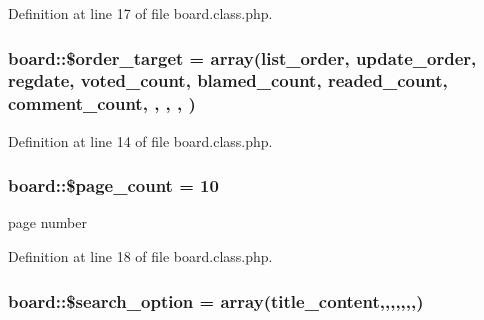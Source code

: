 Definition at line 17 of file board.\+class.\+php.

\subsubsection[{\texorpdfstring{\$order\+\_\+target}{$order_target}}]{\setlength{\rightskip}{0pt plus 5cm}board\+::\$order\+\_\+target = array(\textquotesingle{}list\+\_\+order\textquotesingle{}, \textquotesingle{}update\+\_\+order\textquotesingle{}, \textquotesingle{}regdate\textquotesingle{}, \textquotesingle{}voted\+\_\+count\textquotesingle{}, \textquotesingle{}blamed\+\_\+count\textquotesingle{}, \textquotesingle{}readed\+\_\+count\textquotesingle{}, \textquotesingle{}comment\+\_\+count\textquotesingle{}, \textquotesingle{}, \textquotesingle{}, \textquotesingle{}, \textquotesingle{})}\hypertarget{classboard_a66d1965fe6a51e8143499adeaf3998cc}{}\label{classboard_a66d1965fe6a51e8143499adeaf3998cc}


Definition at line 14 of file board.\+class.\+php.

\subsubsection[{\texorpdfstring{\$page\+\_\+count}{$page_count}}]{\setlength{\rightskip}{0pt plus 5cm}board\+::\$page\+\_\+count = 10}\hypertarget{classboard_ab5d2d3925f753039483da2c65076122b}{}\label{classboard_ab5d2d3925f753039483da2c65076122b}


page number 



Definition at line 18 of file board.\+class.\+php.

\subsubsection[{\texorpdfstring{\$search\+\_\+option}{$search_option}}]{\setlength{\rightskip}{0pt plus 5cm}board\+::\$search\+\_\+option = array(\textquotesingle{}title\+\_\+content\textquotesingle{},\textquotesingle{},\textquotesingle{},\textquotesingle{},\textquotesingle{},\textquotesingle{},\textquotesingle{},\textquotesingle{})}\hypertarget{classboard_a6affe0c86966ebd06572cc4c8abde32b}{}\label{classboard_a6affe0c86966ebd06572cc4c8abde32b}


